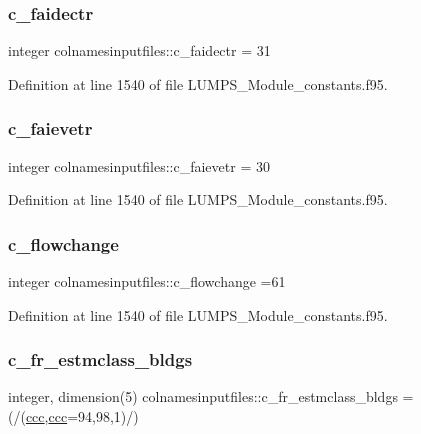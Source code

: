 \subsubsection{\texorpdfstring{c\+\_\+faidectr}{c\_faidectr}}
{\footnotesize\ttfamily integer colnamesinputfiles\+::c\+\_\+faidectr = 31}



Definition at line 1540 of file L\+U\+M\+P\+S\+\_\+\+Module\+\_\+constants.\+f95.

\mbox{\label{namespacecolnamesinputfiles_acfe649c237ebb0719e7397cfaf736d72}} 
\subsubsection{\texorpdfstring{c\+\_\+faievetr}{c\_faievetr}}
{\footnotesize\ttfamily integer colnamesinputfiles\+::c\+\_\+faievetr = 30}



Definition at line 1540 of file L\+U\+M\+P\+S\+\_\+\+Module\+\_\+constants.\+f95.

\mbox{\label{namespacecolnamesinputfiles_a9204c1d2e3a2d060af53f0ab1abacd16}} 
\subsubsection{\texorpdfstring{c\+\_\+flowchange}{c\_flowchange}}
{\footnotesize\ttfamily integer colnamesinputfiles\+::c\+\_\+flowchange =61}



Definition at line 1540 of file L\+U\+M\+P\+S\+\_\+\+Module\+\_\+constants.\+f95.

\mbox{\label{namespacecolnamesinputfiles_a8f2409ed101c2c4017086ab28b8d234a}} 
\subsubsection{\texorpdfstring{c\+\_\+fr\+\_\+estmclass\+\_\+bldgs}{c\_fr\_estmclass\_bldgs}}
{\footnotesize\ttfamily integer, dimension(5) colnamesinputfiles\+::c\+\_\+fr\+\_\+estmclass\+\_\+bldgs = (/(\hyperlink{namespacecolnamesinputfiles_adb0ede73a6346d7e8fd56b1f1e3d1fc4}{ccc},\hyperlink{namespacecolnamesinputfiles_adb0ede73a6346d7e8fd56b1f1e3d1fc4}{ccc}=94,98,1)/)}



